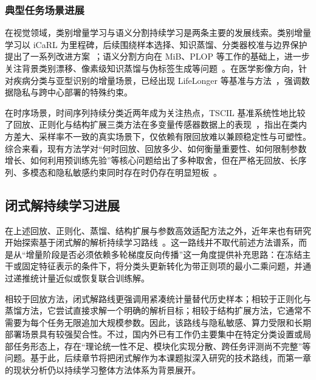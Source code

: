 \subsubsection{典型任务场景进展}

在视觉领域，类别增量学习与语义分割持续学习是两条主要的发展线索。类别增量学习以 iCaRL 为里程碑，后续围绕样本选择、知识蒸馏、分类器校准与边界保护提出了一系列改进方案~\citep{rebuffi2017icarl,castro2018end,hou2019learning}；语义分割方向在 MiB、PLOP 等工作的基础上，进一步关注背景类别漂移、像素级知识蒸馏与伪标签生成等问题~\citep{cermelli2020mib,douillard2021plop}。在医学影像方向，针对疾病分类与亚型识别的增量场景，已经出现 LifeLonger 等基准与方法~\citep{yang2023medmnist,derakhshani2022lifelonger,sun2023few}，强调数据隐私与跨中心部署的特殊约束。

在时序场景，时间序列持续分类近两年成为关注热点，TSCIL 基准系统性地比较了回放、正则化与结构扩展三类方法在多变量传感器数据上的表现~\citep{qiao2024tscil,qiao2023dt2w,huo2025continue}，指出在类内方差大、采样率不一致的真实场景下，仅依赖有限回放难以兼顾稳定性与可塑性。综合来看，现有方法学对“何时回放、回放多少、如何衡量重要性、如何限制参数增长、如何利用预训练先验”等核心问题给出了多种取舍，但在严格无回放、长序列、多模态和隐私敏感约束同时存在时仍存在明显短板~\citep{wang2024survey,zhou2023cil_survey_zh}。

\subsection{闭式解持续学习进展}

在上述回放、正则化、蒸馏、结构扩展与参数高效适配方法之外，近年来也有研究开始探索基于闭式解的解析持续学习路线~\citep{zhuang2022acil,zhuang2024dsal,fang2024air,GKEAL_Zhuang_CVPR2023,GACL_Zhuang_NeurIPS2024,ZHUANG2024107285,he2024realrepresentationenhancedanalytic}。这一路线并不取代前述方法谱系，而是从“增量阶段是否必须依赖多轮梯度反向传播”这一角度提供补充思路：在冻结主干或固定特征表示的条件下，将分类头更新转化为带正则项的最小二乘问题，并通过递推统计量近似或恢复联合训练解。

相较于回放方法，闭式解路线更强调用紧凑统计量替代历史样本；相较于正则化与蒸馏方法，它尝试直接求解一个明确的解析目标；相较于结构扩展方法，它通常不需要为每个任务无限追加大规模参数。因此，该路线与隐私敏感、算力受限和长期部署场景具有较强契合性。不过，国内外已有工作仍主要集中在特定分类设置或局部任务形态上，存在“理论统一性不足、模块化实现分散、跨任务评测尚不完整”等问题。基于此，后续章节将把闭式解作为本课题拟深入研究的技术路线，而第一章的现状分析仍以持续学习整体方法体系为背景展开。

